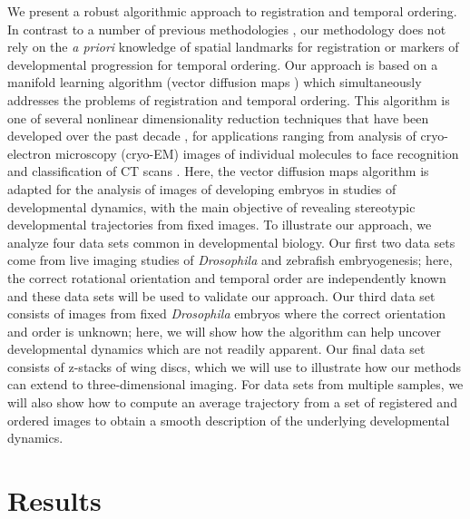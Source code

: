 \documentclass[twocolumn, 10pt]{article}
\begin{document}
We present a robust algorithmic approach to registration and temporal ordering.
%
In contrast to a number of previous methodologies \citep{zitova2003image, rowley1998rotation, hajnal2010medical, greenspan1994rotation, zhao2003face}, our methodology does not rely on the {\em a priori} knowledge of spatial landmarks for registration or markers of developmental progression for temporal ordering.
%
Our approach is based on a manifold learning algorithm (vector diffusion maps \citep{singer2012vector}) which simultaneously addresses the problems of registration and temporal ordering. 
%
This algorithm is one of several nonlinear dimensionality reduction techniques that have been developed over the past decade \citep{Belkin2003, coifman2005geometric, coifman2006geometric, tenenbaum2000global, roweis2000nonlinear}, for
applications ranging from analysis of cryo-electron microscopy (cryo-EM) images of individual molecules  \citep{zhao2014rotationally, singer2011viewing} to face recognition \citep{lafon2006data} and classification of CT scans \citep{fernandez2014diffusion}.
%
Here, the vector diffusion maps algorithm is adapted for the analysis of images of developing embryos in studies of developmental dynamics, with the main objective of revealing stereotypic developmental trajectories from fixed images.
%
To illustrate our approach, we analyze four data sets common in developmental biology. 
%
Our first two data sets come from live imaging studies of {\em Drosophila} and zebrafish embryogenesis; here, the correct rotational orientation and temporal order are independently known and these data sets will be used to validate our approach.
%
Our third data set consists of images from fixed {\em Drosophila} embryos where the correct orientation and order is unknown; here, we will show how the algorithm can help uncover developmental dynamics which are not readily apparent. 
%
Our final data set consists of z-stacks of wing discs, which we will use to illustrate how our methods can extend to three-dimensional imaging. 
%
For data sets from multiple samples, we will also show how to compute an average trajectory from a set of registered and ordered images to obtain a smooth description of the underlying developmental dynamics. 

\section*{Results}
\end{document}
